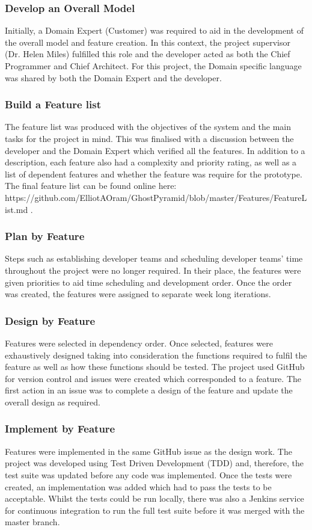 \subsubsection{Develop an Overall Model}
Initially, a Domain Expert (Customer) was required to aid in the development of the overall model and feature creation. In this context, the project supervisor (Dr. Helen Miles) fulfilled this role and the developer acted as both the Chief Programmer and Chief Architect. For this project, the Domain specific language was shared by both the Domain Expert and the developer.

\subsubsection{Build a Feature list}
The feature list was produced with the objectives of the system and  the main tasks for the project in mind. This was finalised with a discussion between the developer and the Domain Expert which verified all the features. In addition to a description, each feature also had a complexity and priority rating, as well as a list of dependent features and whether the feature was require for the prototype. The final feature list can be found online here: \\ https://github.com/ElliotAOram/GhostPyramid/blob/master/Features/FeatureList.md .

\subsubsection{Plan by Feature}
Steps such as establishing developer teams and scheduling developer teams' time throughout the project were no longer required. In their place, the features were given priorities to aid time scheduling and development order. Once the order was created, the features were assigned to separate week long iterations.

\subsubsection{Design by Feature}
Features were selected in dependency order. Once selected, features were exhaustively designed taking into consideration the functions required to fulfil the feature as well as how these functions should be tested. The project used GitHub for version control and issues were created which corresponded to a feature. The first action in an issue was to complete a design of the feature and update the overall design as required.

\subsubsection{Implement by Feature}
Features were implemented in the same GitHub issue as the design work. The project was developed using Test Driven Development (TDD) and, therefore, the test suite was updated before any code was implemented. Once the tests were created, an implementation was added which had to pass the tests to be acceptable. Whilst the tests could be run locally, there was also a Jenkins service for continuous integration to run the full test suite before it was merged with the master branch.  
